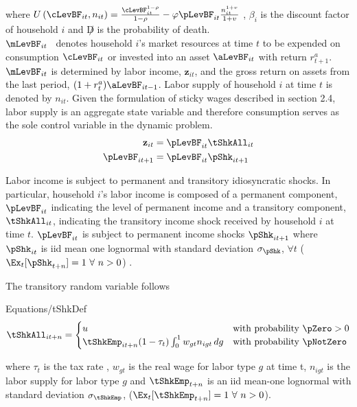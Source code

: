\documentclass[titlepage]{\econtex}\providecommand{\texname}{BufferStockTheory}
\providecommand{\EqDir}{Equations}
\begin{document}
where
$U\left(\cLevBF_{i t}, n_{i t}\right) = \frac{\cLevBF_{i t}^{1-\rho}}{1 -\rho} - \varphi \pLevBF_{it} \frac{n_{it}^{1+v}}{1+v}$ , $\beta_{i}$ is the discount factor of household $i$ and $\not D$ is the probability of death.  \\

$\mLevBF_{it}$ \ denotes household $i$'s market resources at time $t$ to be expended on consumption $\cLevBF_{it}$ or invested into an asset $ \aLevBF_{it}$ with return $r_{t+1}^{a}$.  $\mLevBF_{it}$ is determined by labor income,  $\mathbf{z}_{it}$, and the gross return on assets from the last period, $(1+r_{t}^{a}) \aLevBF_{it-1} $. Labor supply of household $i$ at time $t$ is denoted by $n_{it}$.  Given the formulation of sticky wages described in section 2.4, labor supply is an aggregate state variable and therefore consumption serves as the sole control variable in the dynamic problem. \\




\begin{align*}
\mathbf{z}_{it} &= \pLevBF_{it}\tShkAll_{it} \\
\pLevBF_{it+1} &=\pLevBF_{it} \pShk_{it+1} \\
\end{align*}


Labor income is subject to permanent and transitory idiosyncratic shocks. In particular, household $i$'s labor income is composed of a permanent component, $\pLevBF_{it} $ indicating the level of permanent income and a transitory component, $\tShkAll_{it} $, indicating the transitory income shock received by household $i$ at time $t$. $\pLevBF_{it} $ is subject to permanent income shocks $\pShk_{it+1}$ where $\pShk_{it}$ is iid mean one lognormal with standard deviation $\sigma_\pShk$, $\forall t$  
($\Ex_{t}[{\pShk}_{t+n}]=1~\forall~n>0$) .



The transitory random variable follows   
\begin{verbatimwrite}{\EqDir/tShkDef}
\begin{equation}
\tShkAll _{it+n}=
\begin{cases}
 u \phantom{_{t+1}/\pNotZero} & \text{with probability $\pZero>0$} \\
 \tShkEmp_{it+n} (1-\tau_{t})\int_{0}^{1} w_{gt}n_{igt} \, dg      & \text{with probability $\pNotZero  $} 
\end{cases} \label{eq:tShkDef}
\end{equation}
\end{verbatimwrite}

where $\tau_{t}$ is the tax rate , $w_{gt}$ is the real wage for labor type $g$ at time t, $ n_{igt}$ is the labor supply for labor type $g$ and $\tShkEmp_{t+n}$ is an iid mean-one lognormal with standard deviation $\sigma_{\tShkEmp}$,
($\Ex_{t}[{\tShkEmp}_{t+n}]=1~\forall~n>0$).
\end{document}
